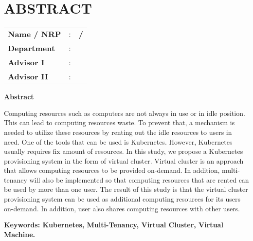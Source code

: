 \chapter*{ABSTRACT}


\vspace{2ex}

\begin{center}
  \large\textbf{\engtatitle{}}
\end{center}

\vspace{2ex}

\begingroup
\setlength{\tabcolsep}{0pt}

\noindent
\begin{tabularx}{\textwidth}{l >{\centering}m{3em} X}
  \textbf{Name / NRP} & : & \textbf{\name{} / \nrp{}} \\
  \textbf{Department} & : & \textbf{\engdepartment{}} \\
  \textbf{Advisor I}  & : & \textbf{\advisor{}}       \\
  \textbf{Advisor II} & : & \textbf{\coadvisor{}}     \\
\end{tabularx}
\endgroup

\noindent
\textbf{Abstract}

Computing resources such as computers are not always in use or in idle
position. This can lead to computing resources waste. To prevent that,
a mechanism is needed to utilize these resources  by renting out the
idle resources to users in need. One of the tools that can be used is Kubernetes.
However, Kubernetes usually requires fix amount of resources. In this study,
we propose a Kubernetes provisioning system in the form of virtual cluster. Virtual
cluster is an approach that allows computing resources to be provided on-demand. In
addition, multi-tenancy will also be implemented so that computing resources that are
rented can be used by more than one user. The result of this study is that the virtual
cluster provisioning system can be used as additional computing resources for its users
on-demand. In addition, user also shares computing resources with other users.

\vspace{2ex}
\noindent
\textbf{Keywords: Kubernetes, Multi-Tenancy, Virtual Cluster, Virtual Machine.}

